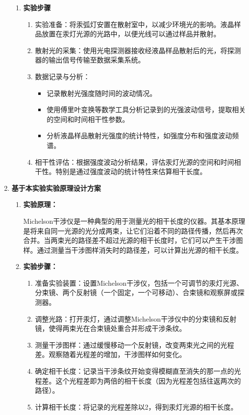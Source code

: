\documentclass[dvipsnames, svgnames,a4paper,11pt]{article}
\begin{document}
\begin{enumerate}
\begin{enumerate}
			\item \textbf{实验步骤}
			
			\begin{enumerate}
				\item 实验准备：将汞弧灯安置在散射室中，以减少环境光的影响。液晶样品放置在汞灯光源的光路中，以便光线可以通过样品并散射。
				\item 散射光的采集：使用光电探测器接收经液晶样品散射后的光，将探测器的输出信号传输至数据采集系统。
				\item 数据记录与分析：
				\begin{itemize}
					\item 记录散射光强度随时间的波动情况。
					\item 使用傅里叶变换等数学工具分析记录到的光强波动信号，提取相关的空间和时间相干性参数。
					\item 分析液晶样品散射光强度的统计特性，如强度分布和强度波动频谱。
				\end{itemize}
				\item 相干性评估：根据强度波动分析结果，评估汞灯光源的空间和时间相干性。特别是通过强度波动的统计特性来估算相干长度。
			\end{enumerate}
		\end{enumerate}
		
		\item \textbf{基于本实验实验原理设计方案}
		
		\begin{enumerate}
			\item \textbf{实验原理：}
			
			Michelson干涉仪是一种典型的用于测量光的相干长度的仪器。其基本原理是将来自同一光源的光分成两束，让它们沿着不同的路径传播，然后再次合并。当两束光的路径差不超过光源的相干长度时，它们可以产生干涉图样。通过测量当干涉图样消失时的路径差，可以计算出光源的相干长度。
			
			\item \textbf{实验步骤：}
			
			\begin{enumerate}
				\item 准备实验装置：设置Michelson干涉仪，包括一个可调节的汞灯光源、分束镜、两个反射镜（一个固定，一个可移动）、合束镜和观察屏或探测器。
				\item 调整光路：打开汞灯，通过调整Michelson干涉仪中的分束镜和反射镜，使得两束光在合束镜处重合并形成干涉条纹。
				\item 测量干涉图样：通过缓慢移动一个反射镜，改变两束光之间的光程差。观察随着光程差的增加，干涉图样如何变化。
				\item 确定相干长度：记录当干涉条纹开始变得模糊直至消失的那一点的光程差。这个光程差即为两倍的相干长度（因为光程差包括往返两次的路径）。
				\item 计算相干长度：将记录的光程差除以2，得到汞灯光源的相干长度。
			\end{enumerate}			
		\end{enumerate}
	\end{enumerate}
	
\end{document}
